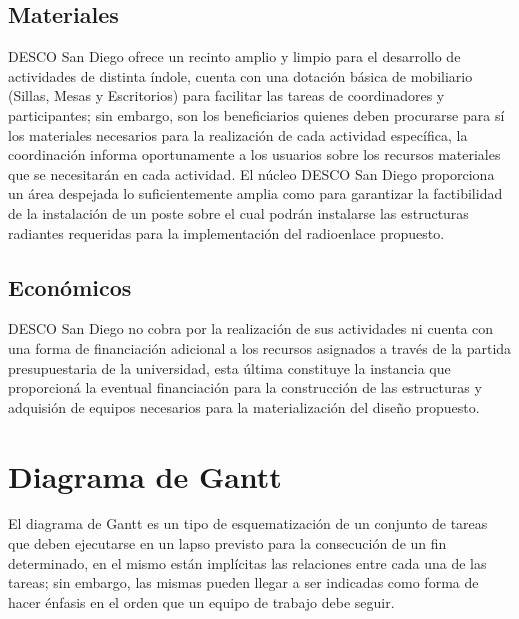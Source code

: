 \documentclass[11pt, a4paper, twosides]{report}
\begin{document}
\subsection{Materiales}
DESCO San Diego ofrece un recinto amplio y limpio para el desarrollo de actividades de distinta índole, cuenta con una dotación básica de mobiliario (Sillas, Mesas y Escritorios) para facilitar las tareas de coordinadores y participantes; sin embargo, son los beneficiarios quienes deben procurarse para sí los materiales necesarios para la realización de cada actividad específica, la coordinación informa oportunamente a los usuarios sobre los recursos materiales que se necesitarán en cada actividad.
El núcleo DESCO San Diego proporciona un área despejada lo suficientemente amplia como para garantizar la factibilidad de la instalación de un poste sobre el cual podrán instalarse las estructuras radiantes requeridas para la implementación del radioenlace propuesto.

\subsection{Económicos}
 DESCO San Diego no cobra por la realización de sus actividades ni cuenta con una forma de financiación adicional a los recursos asignados a través de la partida presupuestaria de la universidad, esta última constituye la instancia que proporcioná la eventual financiación para la construcción de las estructuras y adquisión de equipos necesarios para la materialización del diseño propuesto.
 
 \newpage
\section{Diagrama de Gantt}
 El diagrama de Gantt es un tipo de esquematización de un conjunto de tareas que deben ejecutarse en un lapso previsto para la consecución de un fin determinado, en el mismo están implícitas las relaciones entre cada una de las tareas; sin embargo, las mismas pueden llegar a ser indicadas como forma de hacer énfasis en el orden que un equipo de trabajo debe seguir.\\
\end{document}
